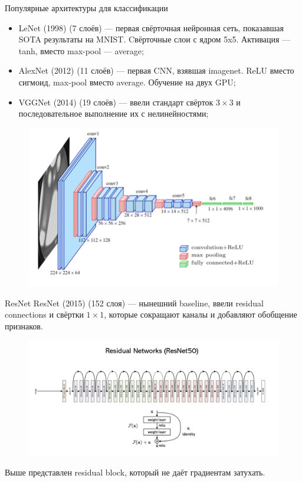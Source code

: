 \documentclass[notheorems, handout]{beamer}
\begin{document}
\begin{frame}{Популярные архитектуры для классификации}
    \begin{itemize}
        \item LeNet (1998) (7 слоёв) --- первая свёрточная нейронная сеть, показавшая SOTA результаты на MNIST. Cвёрточные слои с ядром 5x5. Активация --- tanh, вместо max-pool --- average;
        \item AlexNet (2012) (11 слоёв) --- первая CNN, взявшая imagenet. ReLU вместо сигмоид, max-pool вместо average. Обучение на двух GPU;
        \item VGGNet (2014) (19 слоёв) --- ввели стандарт свёрток $3 \times 3$ и последовательное выполнение их с нелинейностями;
    \end{itemize}

    \begin{figure}
        \includegraphics[width=0.6\linewidth]{img/vggnet.png}    
    \end{figure}
\end{frame}

\begin{frame}{ResNet}
    ResNet (2015) (152 слоя) --- нынешний baseline, ввели residual connections и свёртки $1 \times 1$, которые сокращают каналы и добавляют обобщение признаков.
    \begin{figure}
        \includegraphics[width=\linewidth]{img/resnet.png}    
    \end{figure}
    Выше представлен residual block, который не даёт градиентам затухать.
\end{frame}
\end{document}
